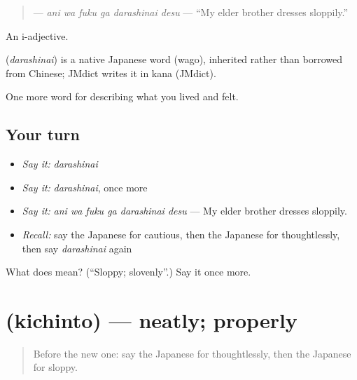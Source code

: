 \begin{quote}
\textbf{  } — \emph{ani wa fuku ga darashinai desu} — \textquotedblleft{}My elder brother dresses sloppily.\textquotedblright{}
\end{quote}

An i-adjective.

\begin{cousinweb}
\textbf{} (\emph{darashinai}) is a native Japanese word (wago), inherited rather than borrowed from Chinese; JMdict writes it in kana (JMdict).
\end{cousinweb}

\begin{grammarlens}[title={What you've built}]
One more word for describing what you lived and felt.
\end{grammarlens}

\subsection*{Your turn}
\begin{itemize}
\raggedright
  \item \emph{Say it:} \emph{darashinai}
  \item \emph{Say it:} \emph{darashinai}, once more
  \item \emph{Say it:} \emph{ani wa fuku ga darashinai desu} — My elder brother dresses sloppily.
  \item \emph{Recall:} say the Japanese for cautious, then the Japanese for thoughtlessly, then say \emph{darashinai} again
\end{itemize}

\begin{tcolorbox}[breakable,colback=teal!4,colframe=teal!35!black,title={Before you move on}]
What does  mean? (\textquotedblleft{}Sloppy; slovenly\textquotedblright{}.) Say it once more.
\end{tcolorbox}
\section[\texorpdfstring{\ja{きちんと} (kichinto)}{きちんと (kichinto)}]{ (kichinto) — neatly; properly}

\label{lesson:JA-C440-kichinto}



\begin{quote}
Before the new one: say the Japanese for thoughtlessly, then the Japanese for sloppy.
\end{quote}

